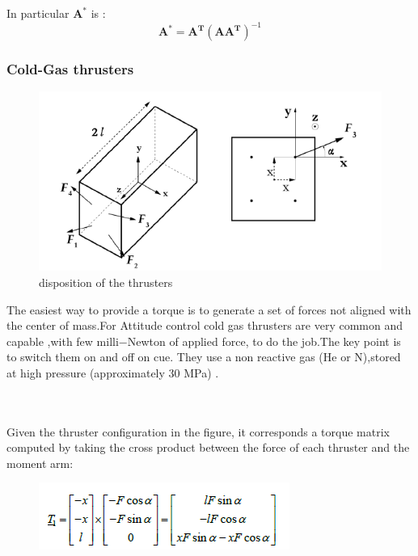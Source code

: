 \documentclass[11pt]{article}
\begin{document}
In particular $\mathbf{A^*}$  is :
\begin{equation}
\mathbf{A^*}=\mathbf{A^T}(\mathbf{A}\mathbf{A^T})^{-1}
\end{equation}

\subsubsection{ Cold-Gas thrusters}
\begin{minipage}{.5\textwidth}

\begin{figure} [H]
\centering 
\includegraphics[scale=0.7]{disposition_thrusters.PNG}
\caption{ disposition of the thrusters
\cite{RW1}}
\end{figure}
\end{minipage}
\begin{minipage}{.5\textwidth}
The easiest way to provide a torque is to generate a set of forces not aligned with the center of mass.For Attitude control cold gas thrusters are very common and capable ,with few milli$-$Newton of applied force, to  do the job.The key point is to switch them  on and off on cue. They use a non reactive gas (He or N),stored at high pressure (approximately 30 MPa) . 
\end{minipage}
\\\\
Given the thruster configuration  in the figure, it corresponds a torque matrix computed by taking the cross product between the force of each thruster and the moment arm:\\
\begin{minipage}{.5 \textwidth}
\begin{figure} [H]
\centering 
\includegraphics[scale=1]{Thrust_matr.PNG}
\end{figure}
\end{minipage}
\end{document}
